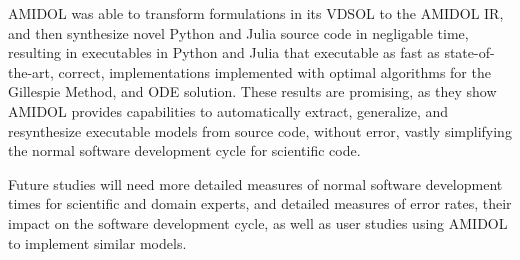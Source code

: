\documentclass[12pt]{galois-whitepaper}
\begin{document}
AMIDOL was able to transform formulations in its VDSOL to the AMIDOL
IR, and then synthesize novel Python and Julia source code in
negligable time, resulting in executables in Python and Julia that
executable as fast as state-of-the-art, correct, implementations
implemented with optimal algorithms for the Gillespie Method, and ODE
solution.  These results are promising, as they show AMIDOL provides
capabilities to automatically extract, generalize, and resynthesize
executable models from source code, without error, vastly simplifying
the normal software development cycle for scientific code.

Future studies will need more detailed measures of normal software
development times for scientific and domain experts, and detailed
measures of error rates, their impact on the software development
cycle, as well as user studies using AMIDOL to implement similar models.
  
\end{document}
